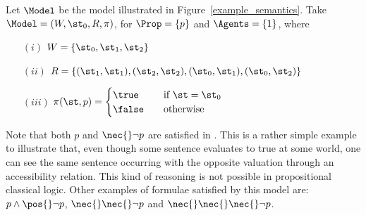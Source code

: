 \begin{example}
    Let $\Model$ be the model illustrated in Figure~\ref{example_semantics}. Take
    $\Model = (W, \st_0, R, \pi)$, for $\Prop = \{p\}$ and $\Agents = \{1\}$,
    where 
    \begin{enumerate}
        \item[$(i)$] $W = \{\st_0, \st_1, \st_2\}$
        \item[$(ii)$] $R = \{(\st_1, \st_1), (\st_2, \st_2),
            (\st_0, \st_1), (\st_0, \st_2)\}$
        \item[$(iii)$] $ \pi(\st, p) = 
            \begin{cases} 
                \true    & \quad \text{if } \st = \st_0\\
                \false   & \quad \text{otherwise}
            \end{cases}
                       $
    \end{enumerate}

    Note that both $p$ and $\nec{} \neg p$ are satisfied in \Model. This is a
    rather simple example to illustrate that, even though some sentence
    evaluates to true at some world, one can see the same sentence
    occurring with the opposite valuation through an accessibility relation.
    This kind of reasoning is not possible in propositional classical logic.
    Other examples of formulae satisfied by this model are: $p \land \pos{} \neg
    p$, $\nec{}\nec{} \neg p$ and $\nec{} \nec {} \nec{} \neg p$.
\end{example}



